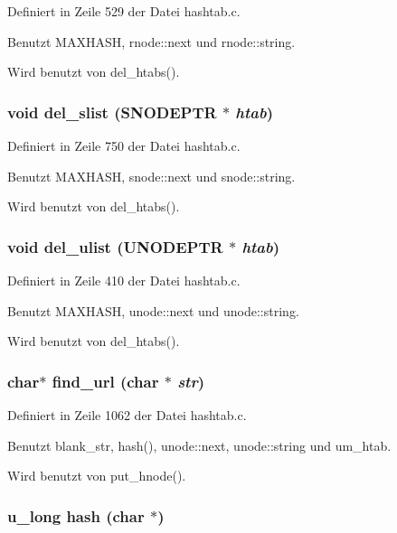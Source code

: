 Definiert in Zeile 529 der Datei hashtab.c.

Benutzt MAXHASH, rnode::next und rnode::string.

Wird benutzt von del\_\-htabs().
\subsubsection{\setlength{\rightskip}{0pt plus 5cm}void del\_\-slist ({\bf SNODEPTR} $\ast$ {\em htab})}\label{hashtab_8c_d526188ebf65c97a2ed3cb521c6e0089}




Definiert in Zeile 750 der Datei hashtab.c.

Benutzt MAXHASH, snode::next und snode::string.

Wird benutzt von del\_\-htabs().
\subsubsection{\setlength{\rightskip}{0pt plus 5cm}void del\_\-ulist ({\bf UNODEPTR} $\ast$ {\em htab})}\label{hashtab_8c_d270fa129a86e1f21e04f6863eb443c4}




Definiert in Zeile 410 der Datei hashtab.c.

Benutzt MAXHASH, unode::next und unode::string.

Wird benutzt von del\_\-htabs().
\subsubsection{\setlength{\rightskip}{0pt plus 5cm}char$\ast$ find\_\-url (char $\ast$ {\em str})}\label{hashtab_8c_6028851c0bddbe6cfc35b4092a62e5e5}




Definiert in Zeile 1062 der Datei hashtab.c.

Benutzt blank\_\-str, hash(), unode::next, unode::string und um\_\-htab.

Wird benutzt von put\_\-hnode().
\subsubsection{\setlength{\rightskip}{0pt plus 5cm}u\_\-long hash (char $\ast$)}\label{hashtab_8c_9d203938872dfbe120779670bfbefddd}




